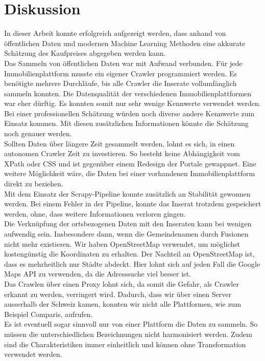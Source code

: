 \section{Diskussion}
In dieser Arbeit konnte erfolgreich aufgezeigt werden, dass anhand von öffentlichen Daten und modernen Machine Learning Methoden eine akkurate Schätzung des Kaufpreises abgegeben werden kann.\\[2ex]
%
Das Sammeln von öffentlichen Daten war mit Aufwand verbunden. Für jede Immobilienplattform musste ein eigener Crawler programmiert werden. Es benötigte mehrere Durchläufe, bis alle Crawler die Inserate vollumfänglich sammeln konnten. Die Datenqualität der verschiedenen Immobilienplattformen war eher dürftig. Es konnten somit nur sehr wenige Kennwerte verwendet werden. Bei einer professionellen Schätzung würden noch diverse andere Kennwerte zum Einsatz kommen. Mit diesen zusätzlichen Informationen könnte die Schätzung noch genauer werden.\\
Sollten Daten über längere Zeit gesammelt werden, lohnt es sich, in einen autonomen Crawler Zeit zu investieren. So besteht keine Abhängigkeit vom XPath oder CSS und ist gegenüber einem Redesign der Portale gewappnet. Eine weitere Möglichkeit wäre, die Daten bei einer vorhandenen Immobilienplattform direkt zu beziehen.\\
Mit dem Einsatz der Scrapy-Pipeline konnte zusätzlich an Stabilität gewonnen werden. Bei einem Fehler in der Pipeline, konnte das Inserat trotzdem gespeichert werden, ohne, dass weitere Informationen verloren gingen.\\
%
Die Verknüpfung der ortsbezogenen Daten mit den Inseraten kann bei wenigen aufwendig sein. Insbesondere dann, wenn die Gemeindenamen durch Fusionen nicht mehr existieren. Wir haben OpenStreetMap verwendet, um möglichst kostengünstig die Koordinaten zu erhalten. Der Nachteil an OpenStreetMap ist, dass es mehrheitlich nur Städte abdeckt. Hier lohnt sich auf jeden Fall die Google Maps API zu verwenden, da die Adresssuche viel besser ist.\\[2ex]
%
Das Crawlen über einen Proxy lohnt sich, da somit die Gefahr, als Crawler erkannt zu werden, verringert wird. Dadurch, dass wir über einen Server ausserhalb der Schweiz kamen, konnten wir nicht alle Plattformen, wie zum Beispiel Comparis, aufrufen.\\
Es ist eventuell sogar sinnvoll nur von einer Plattform die Daten zu sammeln. So müssen die unterschiedlichen Bezeichnungen nicht harmonisiert werden. Zudem sind die Charakteristiken immer einheitlich und können ohne Transformation verwendet werden.

